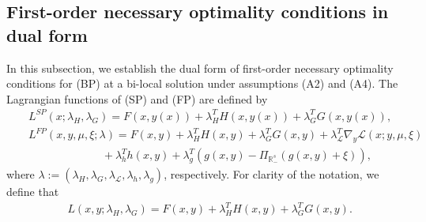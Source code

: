 \documentclass[11pt]{article}
\theoremstyle{definition}
\theoremstyle{remark}
\numberwithin{equation}{section}
\begin{document}
\subsection{First-order necessary optimality conditions  in dual form}\label{sec: Optimality conditions by Clarke subdifferential}
In this subsection, we establish the dual form of first-order necessary optimality conditions for
 (BP) at a bi-local solution  under assumptions \textnormal{(A2)} and \textnormal{(A4)}.
The  Lagrangian functions of (SP) and (FP) are defined by
\begin{eqnarray}
   &&L^{SP}(x;\lambda_H,\lambda_G)=
   F(x,y(x))+\lambda_H^TH(x,y(x))+\lambda_G^TG(x,y(x)),\nonumber\\
   &&L^{FP}(x,y,\mu,\xi;\lambda)= F(x,y)+\lambda_H^TH(x,y)+\lambda_G^TG(x,y)
    +\lambda_{\mathcal{L}}^T\nabla_{y} \mathcal{L}(x;y,\mu,\xi)\nonumber\\
    &&~~~~~~~~~~~~~~~~~~~~~~~~~~~~~~+\lambda_h^Th(x,y)+\lambda_g^T(g(x,y)-\Pi_{\mathbb{R}_{-}^s}(g(x,y)+\xi)),\nonumber
 \end{eqnarray}
where $\lambda:=(\lambda_H,\lambda_G,\lambda_{\mathcal{L}},\lambda_h,\lambda_g)$, respectively.
For clarity of the notation, we define that
\begin{align*}
  & L(x,y;\lambda_H,\lambda_G)= F(x,y)+\lambda_H^TH(x,y)+\lambda_G^TG(x,y).
\end{align*}
\end{document}
